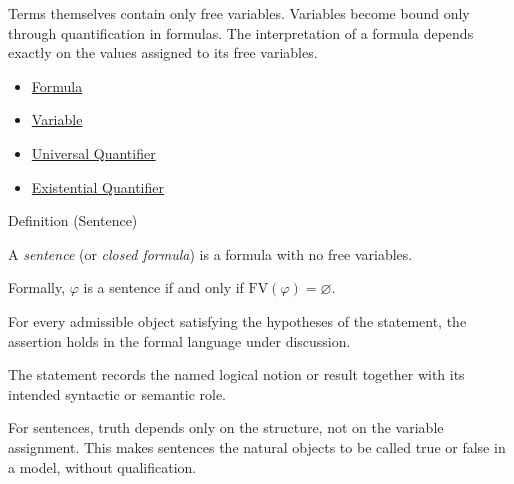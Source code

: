 \begin{remark*}[Exposition]
Terms themselves contain only free variables. Variables become bound only
through quantification in formulas. The interpretation of a formula depends
exactly on the values assigned to its free variables.
\end{remark*}


\begin{dependencies}
\begin{itemize}
  \item \hyperref[def:formula]{Formula}
  \item \hyperref[def:variable]{Variable}
  \item \hyperref[def:universal-q]{Universal Quantifier}
  \item \hyperref[def:existential-q]{Existential Quantifier}
\end{itemize}
\end{dependencies}

\begin{definitionbox}{Definition (Sentence)}
\begin{definition}[Sentence]\label{def:sentence}
A \emph{sentence} (or \emph{closed formula}) is a formula with no free variables.

Formally, $\varphi$ is a sentence if and only if $\mathrm{FV}(\varphi) = \varnothing$.
\end{definition}
\end{definitionbox}
\begin{remark*}
For every admissible object satisfying the hypotheses of the statement, the
assertion holds in the formal language under discussion.
\end{remark*}

\begin{remark*}[Interpretation]
The statement records the named logical notion or result together with its
intended syntactic or semantic role.
\end{remark*}


\begin{remark*}[Exposition]
For sentences, truth depends only on the structure, not on the variable
assignment. This makes sentences the natural objects to be called true or false
in a model, without qualification.
\end{remark*}

